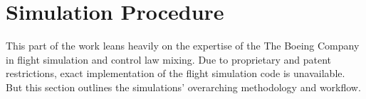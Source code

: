 \section{Simulation Procedure} \label{sec:sim_procedure}

This part of the work leans heavily on the expertise of the The Boeing Company in flight simulation and control law mixing.
Due to proprietary and patent restrictions, exact implementation of the flight simulation code is unavailable. 
But this section outlines the simulations' overarching methodology and workflow.

